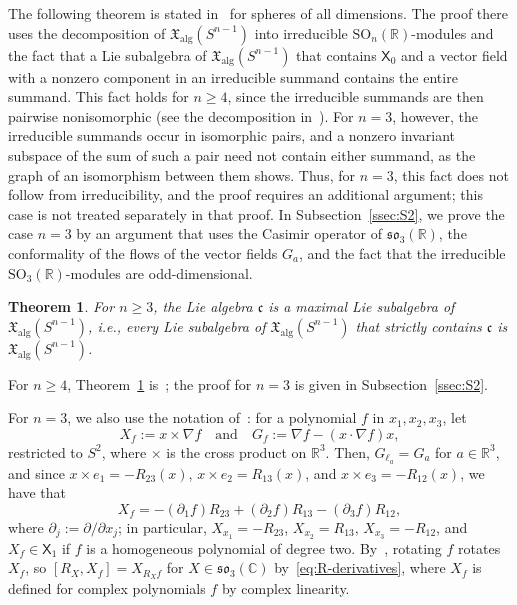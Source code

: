 \documentclass{article}
\newcommand{\R}{\mathbb{R}}
\newcommand{\C}{\mathbb{C}}
\newcommand{\frakc}{\mathfrak{c}}
\newcommand{\xalg}{\mathfrak X_{\mathrm{alg}}}
\newcommand{\sX}{\mathsf{X}}
\newtheorem{theorem}{Theorem}
\theoremstyle{definition}
\theoremstyle{plain}
\begin{document}
The following theorem is stated in~\cite[Lemma~2]{Luk77} for spheres of all dimensions.
The proof there uses the decomposition of $\xalg(S^{n-1})$ into irreducible $\mathrm{SO}_n(\R)$-modules and the fact that a Lie subalgebra of $\xalg(S^{n-1})$ that contains $\sX_0$ and a vector field with a nonzero component in an irreducible summand contains the entire summand.
This fact holds for $n\geq4$, since the irreducible summands are then pairwise nonisomorphic (see the decomposition in~\cite[p.~120]{Luk77}).
For $n=3$, however, the irreducible summands occur in isomorphic pairs, and a nonzero invariant subspace of the sum of such a pair need not contain either summand, as the graph of an isomorphism between them shows.
Thus, for $n=3$, this fact does not follow from irreducibility, and the proof requires an additional argument; this case is not treated separately in that proof.
In Subsection~\ref{ssec:S2}, we prove the case $n=3$ by an argument that uses the Casimir operator of $\mathfrak{so}_3(\R)$, the conformality of the flows of the vector fields $G_a$, and the fact that the irreducible $\mathrm{SO}_3(\R)$-modules are odd-dimensional.

\begin{theorem}\label{thm:luk2}
For $n\geq3$, the Lie algebra $\frakc$ is a maximal Lie subalgebra of $\xalg(S^{n-1})$, i.e.,
every Lie subalgebra of $\xalg(S^{n-1})$ that strictly contains $\frakc$ is $\xalg(S^{n-1})$.
\end{theorem}

For $n\geq4$, Theorem~\ref{thm:luk2} is~\cite[Lemma~2]{Luk77}; the proof for $n=3$ is given in Subsection~\ref{ssec:S2}.

For $n=3$, we also use the notation of~\cite{CofDS2}: for a polynomial $f$ in $x_1,x_2,x_3$, let
$$
  X_f:=x\times\nabla f
  \quad\mbox{and}\quad
  G_f:=\nabla f-(x\cdot\nabla f)x,
$$
restricted to $S^2$, where $\times$ is the cross product on $\R^3$.
Then, $G_{\ell_a}=G_a$ for $a\in\R^3$, and since $x\times e_1=-R_{23}(x)$, $x\times e_2=R_{13}(x)$, and $x\times e_3=-R_{12}(x)$, we have that
$$
X_f=-(\partial_1f)R_{23}+(\partial_2f)R_{13}-(\partial_3f)R_{12},
$$
where $\partial_j:=\partial/\partial x_j$; in particular, $X_{x_1}=-R_{23}$, $X_{x_2}=R_{13}$, $X_{x_3}=-R_{12}$, and $X_f\in\sX_1$ if $f$ is a homogeneous polynomial of degree two.
By~\cite[Section~2.2]{CofDS2}, rotating $f$ rotates $X_f$, so $[R_X,X_f]=X_{R_Xf}$ for $X\in\mathfrak{so}_3(\C)$ by~\eqref{eq:R-derivatives}, where $X_f$ is defined for complex polynomials $f$ by complex linearity.
\end{document}
